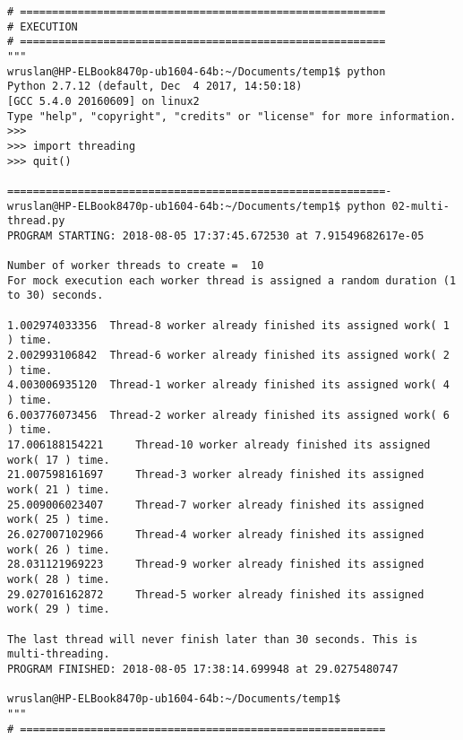 \begin{lstlisting}[caption={App4-Python Parallel Multithreading Codes}, label=App4-Python Parallel Multithreading]
# =========================================================
# EXECUTION 
# =========================================================
"""
wruslan@HP-ELBook8470p-ub1604-64b:~/Documents/temp1$ python
Python 2.7.12 (default, Dec  4 2017, 14:50:18) 
[GCC 5.4.0 20160609] on linux2
Type "help", "copyright", "credits" or "license" for more information.
>>> 
>>> import threading
>>> quit()

===========================================================-
wruslan@HP-ELBook8470p-ub1604-64b:~/Documents/temp1$ python 02-multi-thread.py 
PROGRAM STARTING: 2018-08-05 17:37:45.672530 at 7.91549682617e-05  

Number of worker threads to create =  10
For mock execution each worker thread is assigned a random duration (1 to 30) seconds.

1.002974033356 	Thread-8 worker already finished its assigned work( 1 ) time.
2.002993106842 	Thread-6 worker already finished its assigned work( 2 ) time.
4.003006935120 	Thread-1 worker already finished its assigned work( 4 ) time.
6.003776073456 	Thread-2 worker already finished its assigned work( 6 ) time.
17.006188154221 	Thread-10 worker already finished its assigned work( 17 ) time.
21.007598161697 	Thread-3 worker already finished its assigned work( 21 ) time.
25.009006023407 	Thread-7 worker already finished its assigned work( 25 ) time.
26.027007102966 	Thread-4 worker already finished its assigned work( 26 ) time.
28.031121969223 	Thread-9 worker already finished its assigned work( 28 ) time.
29.027016162872 	Thread-5 worker already finished its assigned work( 29 ) time.

The last thread will never finish later than 30 seconds. This is multi-threading.
PROGRAM FINISHED: 2018-08-05 17:38:14.699948 at 29.0275480747  

wruslan@HP-ELBook8470p-ub1604-64b:~/Documents/temp1$ 
"""
# =========================================================
\end{lstlisting}

